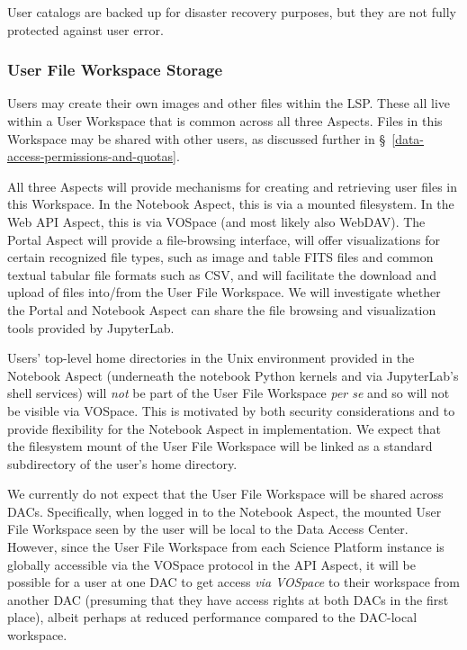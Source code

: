 User catalogs are backed up for disaster recovery purposes, but they are not
fully protected against user error.

\subsubsection{User File Workspace Storage}\label{user-workspace-storage}

Users may create their own images and other files within the LSP.
These all live within a User Workspace that is common across all three Aspects.
Files in this Workspace may be shared with other users, as discussed further in
\S~\ref{data-access-permissions-and-quotas}.

All three Aspects will provide mechanisms for creating and retrieving user
files in this Workspace.
In the Notebook Aspect, this is via a mounted filesystem.
In the Web API Aspect, this is via VOSpace (and most likely also WebDAV).
The Portal Aspect will provide a file-browsing interface, will offer
visualizations for certain recognized file types, such as image and table
FITS files and common textual tabular file formats such as CSV, and will
facilitate the download and upload of files into/from the User File Workspace.
We will investigate whether the Portal and Notebook Aspect can share the
file browsing and visualization tools provided by JupyterLab.

Users' top-level home directories in the Unix environment provided in the
Notebook Aspect (underneath the notebook Python kernels and via JupyterLab's
shell services) will \emph{not} be part of the User File Workspace \emph{per
se} and so will not be visible via VOSpace.
This is motivated by both security considerations and to provide flexibility
for the Notebook Aspect in implementation.
We expect that the filesystem mount of the User File Workspace will be
linked as a standard subdirectory of the user's home directory.

We currently do not expect that the User File Workspace will be shared
across DACs.
Specifically, when logged in to the Notebook Aspect, the mounted User File
Workspace seen by the user will be local to the Data Access Center.
However, since the User File Workspace from each Science Platform instance
is globally accessible via the VOSpace protocol in the API Aspect, it will be
possible for a user at one DAC to get access \emph{via VOSpace}
to their workspace from another DAC
(presuming that they have access rights at both DACs in the first place),
albeit perhaps at reduced performance compared to the DAC-local workspace.

